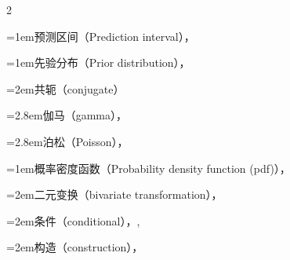 \begin{multicols}{2}
\par\addvspace{2pt}
\par\noindent\hangindent=1em\hspace*{0em}\label{idx:823}预测区间（Prediction interval），\hyperref[def:11.3.5]{\pageref*{def:11.3.5}}\par
\par\addvspace{2pt}
\par\noindent\hangindent=1em\hspace*{0em}\label{idx:824}先验分布（Prior distribution），\hyperref[idxocc:824:293]{\pageref*{idxocc:824:293}}\par
{}
\par\noindent\hangindent=2em\hspace*{1em}\label{idx:825}共轭（conjugate）\par
\par\noindent\hangindent=2.8em\hspace*{1.8em}\label{idx:826}伽马（gamma），\hyperref[exercise:7.23]{\pageref*{exercise:7.23}}\par
\par\noindent\hangindent=2.8em\hspace*{1.8em}\label{idx:827}泊松（Poisson），\hyperref[exercise:7.24]{\pageref*{exercise:7.24}}\par
\par\addvspace{2pt}
\par\noindent\hangindent=1em\hspace*{0em}\label{idx:828}概率密度函数（Probability density function (pdf)），\hyperref[def:1.6.3]{\pageref*{def:1.6.3}}\par
\par\noindent\hangindent=2em\hspace*{1em}\label{idx:829}二元变换（bivariate transformation），\hyperref[eq:4.3.2]{\pageref*{eq:4.3.2}}\par
\par\noindent\hangindent=2em\hspace*{1em}\label{idx:830}条件（conditional），\hyperref[def:4.2.3]{\pageref*{def:4.2.3}}, \hyperref[eq:4.6.6]{\pageref*{eq:4.6.6}}\par
\par\noindent\hangindent=2em\hspace*{1em}\label{idx:831}构造（construction），\hyperref[idxocc:831:61]{\pageref*{idxocc:831:61}}\par

\end{multicols}
